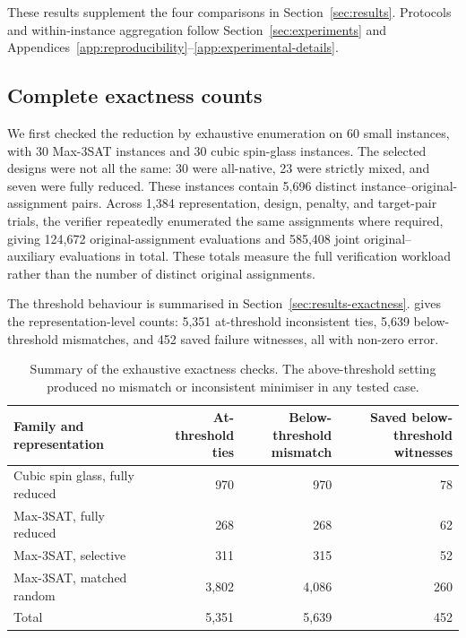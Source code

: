 \documentclass[a4paper,onecolumn,11pt,unpublished]{quantumarticle}
\theoremstyle{remark}
\begin{document}
These results supplement the four comparisons in Section~\ref{sec:results}.
Protocols and within-instance aggregation follow Section~\ref{sec:experiments}
and Appendices~\ref{app:reproducibility}--\ref{app:experimental-details}.

\FloatBarrier
\subsection{Complete exactness counts}
\label{app:results-exactness}

We first checked the reduction by exhaustive enumeration on 60 small
instances, with 30 Max-3SAT instances and 30 cubic spin-glass instances.  The
selected designs were not all the same: 30 were all-native, 23 were strictly
mixed, and seven were fully reduced.  These instances contain 5,696 distinct
instance--original-assignment pairs.  Across 1,384 representation, design,
penalty, and target-pair trials, the verifier repeatedly enumerated the same
assignments where required, giving 124,672 original-assignment evaluations and
585,408 joint original--auxiliary evaluations in total.  These totals measure
the full verification workload rather than the number of distinct original
assignments.

The threshold behaviour is summarised in Section~\ref{sec:results-exactness}.
 gives the representation-level counts:
5,351 at-threshold inconsistent ties, 5,639 below-threshold mismatches,
and 452 saved failure witnesses, all with non-zero error.

\begin{table}[!htbp]
    \centering
    \small
    \caption{Summary of the exhaustive exactness checks.  The
    above-threshold setting produced no mismatch or inconsistent minimiser in
    any tested case.}
    \label{tab:e1-exactness-summary}
    \begin{tabular}{@{}lrrr@{}}
        \toprule
        Family and representation
        & \shortstack{At-threshold\\ties}
        & \shortstack{Below-threshold\\mismatch}
        & \shortstack{Saved below-threshold\\witnesses}\\
        \midrule
        Cubic spin glass, fully reduced & 970 & 970 & 78\\
        Max-3SAT, fully reduced          & 268 & 268 & 62\\
        Max-3SAT, selective              & 311 & 315 & 52\\
        Max-3SAT, matched random         & 3,802 & 4,086 & 260\\
        \midrule
        Total                            & 5,351 & 5,639 & 452\\
        \bottomrule
    \end{tabular}
\end{table}
\end{document}
